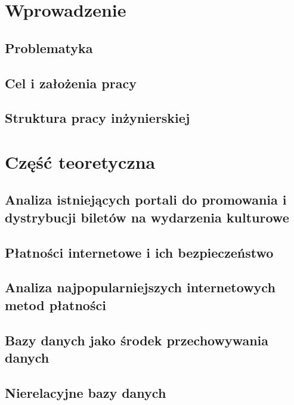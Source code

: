 \documentclass[12pt]{article}
\begin{document}
\begin{sloppypar}


\tableofcontents
\newpage

\section{Wprowadzenie}
{
\subsection{Problematyka}
{

}
\subsection{Cel i założenia pracy}
{

}
\subsection{Struktura pracy inżynierskiej}
{

}
}

\section{Część teoretyczna}
{
\subsection{Analiza istniejących portali do promowania i dystrybucji biletów na wydarzenia kulturowe}
{

}
\subsection{Płatności internetowe i ich bezpieczeństwo}
{

}
\subsection{Analiza najpopularniejszych internetowych metod płatności}
{

}
\subsection{Bazy danych jako środek przechowywania danych}
{

}
\subsection{Nierelacyjne bazy danych}
{

}}
\end{sloppypar}
\end{document}
